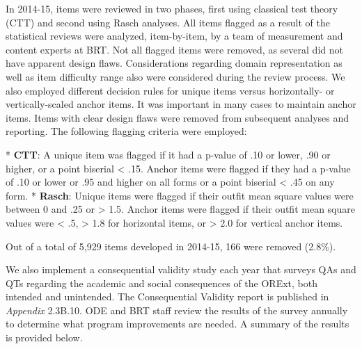 \documentclass[]{article}
\begin{document}
In 2014-15, items were reviewed in two phases, first using classical
test theory (CTT) and second using Rasch analyses. All items flagged as
a result of the statistical reviews were analyzed, item-by-item, by a
team of measurement and content experts at BRT. Not all flagged items
were removed, as several did not have apparent design flaws.
Considerations regarding domain representation as well as item
difficulty range also were considered during the review process. We also
employed different decision rules for unique items versus horizontally-
or vertically-scaled anchor items. It was important in many cases to
maintain anchor items. Items with clear design flaws were removed from
subsequent analyses and reporting. The following flagging criteria were
employed:

\clearpage
* \textbf{CTT}: A unique item was flagged if it had a p-value of .10 or
lower, .90 or higher, or a point biserial \textless{} .15. Anchor items
were flagged if they had a p-value of .10 or lower or .95 and higher on
all forms or a point biserial \textless{} .45 on any form. *
\textbf{Rasch}: Unique items were flagged if their outfit mean square
values were between 0 and .25 or \textgreater{} 1.5. Anchor items were
flagged if their outfit mean square values were \textless{} .5,
\textgreater{} 1.8 for horizontal items, or \textgreater{} 2.0 for
vertical anchor items.

Out of a total of 5,929 items developed in 2014-15, 166 were removed
(2.8\%).

We also implement a consequential validity study each year that surveys
QAs and QTs regarding the academic and social consequences of the ORExt,
both intended and unintended. The Consequential Validity report is
published in \emph{Appendix} 2.3B.10. ODE and BRT staff review the
results of the survey annually to determine what program improvements
are needed. A summary of the results is provided below.
\end{document}
